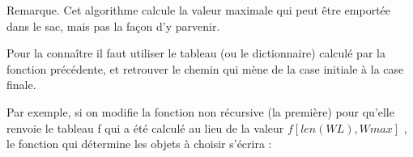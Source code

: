 \documentclass[letterpaper,10pt,english]{jupyterBook}
\begin{document}
\sphinxAtStartPar
Remarque. Cet algorithme calcule la valeur maximale qui peut être emportée dans le sac, mais pas la façon d’y parvenir.

\sphinxAtStartPar
Pour la connaître il faut utiliser le tableau (ou le dictionnaire) calculé par la fonction précédente, et retrouver le chemin qui mène de la case initiale à la case finale.

\sphinxAtStartPar
Par exemple, si on modifie la fonction non récursive (la première) pour qu’elle renvoie le tableau f qui a été calculé au lieu de la valeur \(f[len(WL), Wmax]\) , le fonction qui détermine les objets à choisir s’écrira :
\begin{sphinxVerbatimInput}

\begin{sphinxVerbatim}[commandchars=\\\{\}]
  
       
           
             \PYG{p}{[}\PYG{p}{]}
                \PYG{p}{[}\PYG{p}{]}\PYG{p}{[}\PYG{p}{]}\PYG{p}{[}\PYG{p}{[}\PYG{p}{]}\PYG{p}{]}\PYG{p}{[}\PYG{p}{]}
                \PYG{p}{[}\PYG{p}{]}\PYG{p}{[}\PYG{p}{]}
     \PYG{p}{[}\PYG{p}{]}
\end{sphinxVerbatim}
\end{sphinxVerbatimInput}
\end{document}
